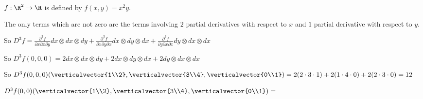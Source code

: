 \documentclass{ximera}
\begin{document}
\begin{question}
  $f:\R^2 \to \R$ is defined by $f(x,y) = x^2y$.  
  \begin{solution}
    \begin{hint}
      The only terms which are not zero are the terms involving $2$ partial derivatives with respect to $x$ and $1$ partial derivative with respect to $y$.
    \end{hint}
    \begin{hint}
      So $D^3f = \frac{\partial ^3 f}{\partial x \partial x \partial y} dx \otimes dx \otimes dy+ \frac{\partial ^3 f}{\partial x \partial y \partial x} dx \otimes dy \otimes dx+ \frac{\partial ^3 f}{\partial y \partial x \partial x} dy \otimes dx \otimes dx$
    \end{hint}
    \begin{hint}
      So $D^3f(0,0,0) = 2 dx\otimes dx \otimes dy+ 2 dx\otimes dy \otimes dx+2 dy\otimes dx \otimes dx$
    \end{hint}
    \begin{hint}
      So $D^3f(0,0,0)(\verticalvector{1\\2},\verticalvector{3\\4},\verticalvector{0\\1}) =2( 2 \cdot 3 \cdot 1)+2( 1 \cdot 4 \cdot 0)+2(2 \cdot 3 \cdot 0) = 12$
    \end{hint}
    $D^3f(0,0)(\verticalvector{1\\2},\verticalvector{3\\4},\verticalvector{0\\1})=$
  \end{solution}
\end{question}
\end{document}
